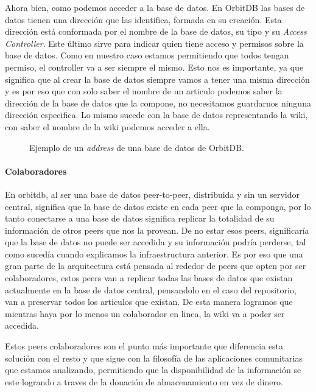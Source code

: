 Ahora bien, como podemos acceder a la base de datos. En OrbitDB las bases de datos tienen una dirección que las identifica, formada en su creación. Esta dirección está conformada por el nombre de la base de datos, su tipo y su \textit{Access Controller}. Este último sirve para indicar quien tiene acceso y permisos sobre la base de datos. Como en nuestro caso estamos permitiendo que todos tengan permiso, el controller va a ser siempre el mismo. Esto nos es importante, ya que significa que al crear la base de datos siempre vamos a tener una misma dirección y es por eso que con solo saber el nombre de un articulo podemos saber la dirección de la base de datos que la compone, no necesitamos guardarnos ninguna dirección especifica. Lo mismo sucede con la base de datos representando la wiki, con saber el nombre de la wiki podemos acceder a ella.

\begin{figure}[h]
\centering
{}
\caption{Ejemplo de un \textit{address} de una base de datos de OrbitDB.}
\end{figure}

\paragraph{Colaboradores}

En orbitdb, al ser una base de datos peer-to-peer, distribuida y sin un servidor central, significa que la base de datos existe en cada peer que la componga, por lo tanto conectarse a una base de datos significa replicar la totalidad de su información de otros peers que nos la provean. De no estar esos peers, significaría que la base de datos no puede ser accedida y su información podría perderse, tal como sucedía cuando explicamos la infraestructura anterior. Es por eso que una gran parte de la arquitectura está pensada al rededor de peers que opten por ser colaboradores, estos peers van a replicar todas las bases de datos que existan actualmente en la base de datos central, pensandolo en el caso del repositorio, van a preservar todos los articulos que existan. De esta manera logramos que mientras haya por lo menos un colaborador en linea, la wiki va a poder ser accedida.

Estos peers colaboradores son el punto más importante que diferencia esta solución con el resto y que sigue con la filosofía de las aplicaciones comunitarias que estamos analizando, permitiendo que la disponibilidad de la información se este logrando a traves de la donación de almacenamiento en vez de dinero.

